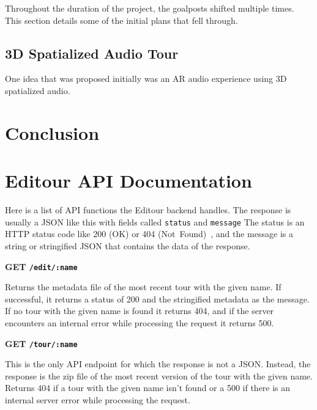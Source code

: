 \documentclass[a4paper, 10pt, american, titlepage]{article}
\newenvironment{indented}[1]%
{\begin{list}{}%
	{\setlength{\leftmargin}{#1}}%
	\item[]%
}
{\end{list}}
\begin{document}
Throughout the duration of the project, the goalposts shifted multiple times.
This section details some of the initial plans that fell through.

\subsection{3D Spatialized Audio Tour}
\label{sec:3dSpatializedAudioTour}

One idea that was proposed initially was an AR audio experience using 3D
spatialized audio.

\clearpage

\section{Conclusion}
\label{sec:conclusion}

\clearpage %

\begin{singlespace}
	\printbibliography
\end{singlespace}

\clearpage

\appendices
\section{Editour API Documentation}
\label{sec:editourAPIDocumentation}

Here is a list of API functions the Editour backend handles. The response is
usually a JSON like this with fields called \texttt{status} and \texttt{message}
The status is an HTTP status code like 200 (OK) or 404
(Not~Found)~\autocite{rfc7231}, and the message is a string or stringified JSON
that contains the data of the response.

\noindent\textbf{GET \texttt{/edit/:name}}

\begin{indented}{1cm}
	Returns the metadata file of the most recent tour with the given name. If
	successful, it returns a status of 200 and the stringified metadata as the
	message. If no tour with the given name is found it returns 404, and if the
	server encounters an internal error while processing the request it returns
	500.
\end{indented}

\noindent\textbf{GET \texttt{/tour/:name}}

\begin{indented}{1cm}
	This is the only API endpoint for which the response is not a JSON. Instead,
	the response is the zip file of the most recent version of the tour with the
	given name. Returns 404 if a tour with the given name isn't found or a 500
	if there is an internal server error while processing the request.
\end{indented}
\end{document}
